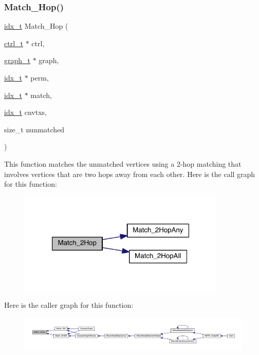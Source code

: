 \subsubsection{\texorpdfstring{Match\+\_\+Hop()}{Match\_2Hop()}}
{\footnotesize\ttfamily \hyperlink{a00876_aaa5262be3e700770163401acb0150f52}{idx\+\_\+t} Match\+\_\+Hop (\begin{DoxyParamCaption}\item[{\hyperlink{a00742}{ctrl\+\_\+t} $\ast$}]{ctrl,  }\item[{\hyperlink{a00734}{graph\+\_\+t} $\ast$}]{graph,  }\item[{\hyperlink{a00876_aaa5262be3e700770163401acb0150f52}{idx\+\_\+t} $\ast$}]{perm,  }\item[{\hyperlink{a00876_aaa5262be3e700770163401acb0150f52}{idx\+\_\+t} $\ast$}]{match,  }\item[{\hyperlink{a00876_aaa5262be3e700770163401acb0150f52}{idx\+\_\+t}}]{cnvtxs,  }\item[{size\+\_\+t}]{nunmatched }\end{DoxyParamCaption})}

This function matches the unmatched vertices using a 2-\/hop matching that involves vertices that are two hops away from each other. Here is the call graph for this function\+:\nopagebreak
\begin{figure}[H]
\begin{center}
\leavevmode
\includegraphics[width=280pt]{a00945_aead846b2c69509c914426ff087509934_cgraph}
\end{center}
\end{figure}
Here is the caller graph for this function\+:\nopagebreak
\begin{figure}[H]
\begin{center}
\leavevmode
\includegraphics[width=350pt]{a00945_aead846b2c69509c914426ff087509934_icgraph}
\end{center}
\end{figure}
\mbox{\label{a00945_aa56d53cace160be27fb1750dcaffbc04}} 
